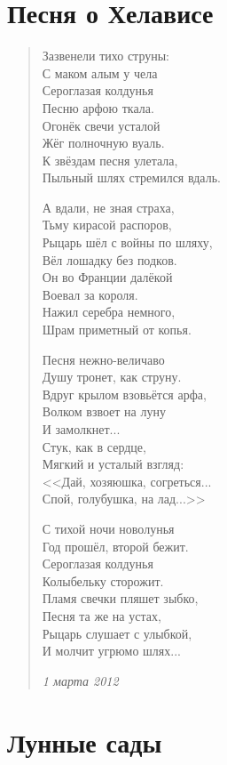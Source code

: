 \documentclass[a4paper,12pt,fleqn]{book}\usepackage{polyglossia}\setdefaultlanguage[babelshorthands=true]{russian}\setotherlanguage{english}\defaultfontfeatures{Ligatures=TeX,Mapping=tex-text}\usepackage{xcolor}\newcommand{\ml}[3]{#2}
\begin{document}
\section{Песня о Хелависе}

\begin{verse}
Зазвенели тихо струны:\\
С маком алым у чела\\
Сероглазая колдунья\\
Песню арфою ткала.\\
Огонёк свечи усталой\\
Жёг полночную вуаль.\\
К звёздам песня улетала,\\
Пыльный шлях стремился вдаль.

А вдали, не зная страха,\\
Тьму кирасой распоров,\\
Рыцарь шёл с войны по шляху,\\
Вёл лошадку без подков.\\
Он во Франции далёкой\\
Воевал за короля.\\
Нажил серебра немного,\\
Шрам приметный от копья.

Песня нежно-величаво\\
Душу тронет, как струну.\\
Вдруг крылом взовьётся арфа,\\
Волком взвоет на луну\\
И замолкнет...\\
Стук, как в сердце,\\
Мягкий и усталый взгляд:\\
<<Дай, хозяюшка, согреться...\\
Спой, голубушка, на лад...>>

С тихой ночи новолунья\\
Год прошёл, второй бежит.\\
Сероглазая колдунья\\
Колыбельку сторожит.\\
Пламя свечки пляшет зыбко,\\
Песня та же на устах,\\
Рыцарь слушает с улыбкой,\\
И молчит угрюмо шлях...

\emph{1 марта 2012}
\end{verse}
\newpage

\section{Лунные сады}
\end{document}
